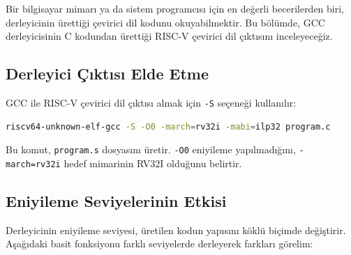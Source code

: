 Bir bilgisayar mimarı ya da sistem programcısı için en değerli becerilerden biri, derleyicinin ürettiği çevirici dil kodunu okuyabilmektir. Bu bölümde, GCC derleyicisinin C kodundan ürettiği RISC-V çevirici dil çıktısını inceleyeceğiz.

\subsection{Derleyici Çıktısı Elde Etme}
\label{subsec:derleyici-ciktisi}

GCC ile RISC-V çevirici dil çıktısı almak için \texttt{-S} seçeneği kullanılır:

\begin{lstlisting}[language=bash]
riscv64-unknown-elf-gcc -S -O0 -march=rv32i -mabi=ilp32 program.c
\end{lstlisting}

Bu komut, \texttt{program.s} dosyasını üretir. \texttt{-O0} eniyileme yapılmadığını, \texttt{-march=rv32i} hedef mimarinin RV32I olduğunu belirtir.

\subsection{Eniyileme Seviyelerinin Etkisi}
\label{subsec:eniyileme}

Derleyicinin eniyileme seviyesi, üretilen kodun yapısını köklü biçimde değiştirir. Aşağıdaki basit fonksiyonu farklı seviyelerde derleyerek farkları görelim:

